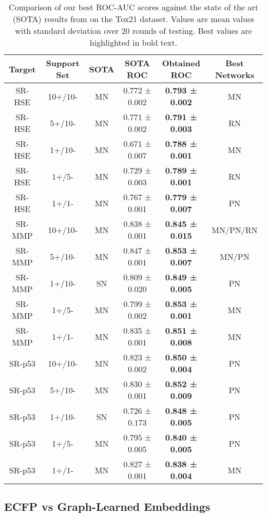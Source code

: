\begin{table}[ht]
	\centering
	\begin{tabular}{@{}cccccc@{}}
	\hline
	\textbf{Target} & \textbf{Support Set} & \textbf{SOTA} & \textbf{SOTA ROC} & \textbf{Obtained ROC} & \textbf{Best Networks} \\
	\hline	
	SR-HSE & 10+/10- & MN & 0.772 ± 0.002 & \textbf{0.793 ± 0.002} & MN \\
	SR-HSE & 5+/10- & MN & 0.771 ± 0.002 & \textbf{0.791 ± 0.003} & RN \\
	SR-HSE & 1+/10- & MN & 0.671 ± 0.007 & \textbf{0.788 ± 0.001} & MN \\
	SR-HSE & 1+/5- & MN & 0.729 ± 0.003 & \textbf{0.789 ± 0.001} & RN \\
	SR-HSE & 1+/1- & MN & 0.767 ± 0.001 & \textbf{0.779 ± 0.007} & PN \\
	SR-MMP & 10+/10- & MN & 0.838 ± 0.001 & \textbf{0.845 ± 0.015} & MN/PN/RN \\
	SR-MMP & 5+/10- & MN & 0.847 ± 0.001 & \textbf{0.853 ± 0.007} & MN/PN \\
	SR-MMP & 1+/10- & SN & 0.809 ± 0.020 & \textbf{0.849 ± 0.005} & PN \\
	SR-MMP & 1+/5- & MN & 0.799 ± 0.002 & \textbf{0.853 ± 0.001} & MN \\
	SR-MMP & 1+/1- & MN & 0.835 ± 0.001 & \textbf{0.851 ± 0.008} & MN \\
	SR-p53 & 10+/10- & MN & 0.823 ± 0.002 & \textbf{0.850 ± 0.004} & PN \\
	SR-p53 & 5+/10- & MN & 0.830 ± 0.001 & \textbf{0.852 ± 0.009} & PN \\
	SR-p53 & 1+/10- & SN & 0.726 ± 0.173 & \textbf{0.848 ± 0.005} & PN \\
	SR-p53 & 1+/5- & MN & 0.795 ± 0.005 & \textbf{0.840 ± 0.005} & PN \\
	SR-p53 & 1+/1- & MN & 0.827 ± 0.001 & \textbf{0.838 ± 0.004} & MN \\
	\hline	
	\end{tabular}
	\caption[Comparing our best ROC-AUC scores with the SOTA results on Tox21.]{Comparison of our best ROC-AUC scores against the state of the art (SOTA) results from \citet{altae2017low} on the Tox21 dataset. Values are mean values with standard deviation over 20 rounds of testing. Best values are highlighted in bold text.}
	\label{table:Tox21-sota-ours}
\end{table}

\subsection{ECFP vs Graph-Learned Embeddings}

